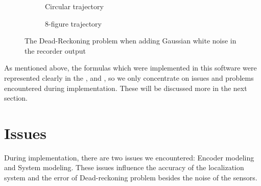 \documentclass[letterpaper,12pt]{article}
\begin{document}
\begin{figure}[H]
    \centering
    \begin{subfigure}[b]{8.cm}
        \centering
        \captionsetup{justification=centering}
        \caption{Circular trajectory}
        \label{fig:kermit}
    \end{subfigure}
    \begin{subfigure}[b]{8.cm}
        \centering
        \captionsetup{justification=centering}
        \caption{8-figure trajectory}
        \label{fig:rana}
    \end{subfigure}
\caption{The Dead-Reckoning problem when adding Gaussian white noise in the recorder output}
\label{fig:map3_2}
\end{figure}

\noindent
As mentioned above, the formulas which were implemented in this software were represented clearly in the \cite{Lectures}, \cite{Book} and \cite{SoftwareDesign}, so we only concentrate on issues and problems encountered during implementation. These will be discussed more in the next section.


\section{Issues}
\setcounter{figure}{0}  
During implementation, there are two issues we encountered: Encoder modeling and System modeling. These issues influence the accuracy of the localization system and the error of Dead-reckoning problem besides the noise of the sensors.
\label{sec:Issues}
\end{document}
